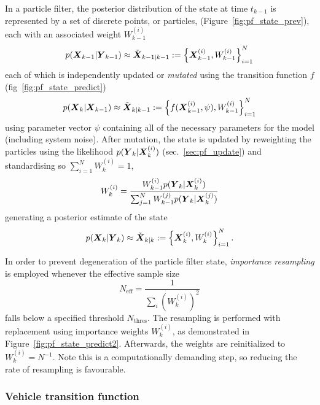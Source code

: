 In a particle filter, the posterior distribution of the state at time $t_{k-1}$
is represented by a set of discrete points, or particles, (Figure~\ref{fig:pf_state_prev}),
each with an associated weight $W_{k-1}^{(i)}$
\begin{equation}
p(\mbox{$\boldsymbol{X}$}_{k-1} | \mbox{$\boldsymbol{Y}$}_{k-1}) \approx \tilde{\mbox{$\boldsymbol{X}$}}_{k-1|k-1} 
:= \left\{\mbox{$\boldsymbol{X}$}_{k-1}^{(i)}, W_{k-1}^{(i)}\right\}_{i=1}^N
\end{equation}
each of which is independently updated or \emph{mutated} using the transition function $f$ (fig~\ref{fig:pf_state_predict})
\begin{equation}
p(\mbox{$\boldsymbol{X}$}_k | \mbox{$\boldsymbol{X}$}_{k-1}) \approx \tilde{\mbox{$\boldsymbol{X}$}}_{k|k-1} := 
\left\{f(\mbox{$\boldsymbol{X}$}_{k-1}^{(i)}, \psi), W_{k-1}^{(i)}\right\}_{i=1}^N
\end{equation}
using parameter vector $\psi$ containing all of the necessary parameters
for the model (including system noise).
After mutation, 
the state is updated by reweighting the particles using the likelihood $p(\mbox{$\boldsymbol{Y}$}_k | \mbox{$\boldsymbol{X}$}_k^{(i)})$ 
(sec.~\ref{sec:pf_update}) and standardising so $\sum_{i=1}^N W_k^{(i)} = 1$,
\begin{equation*}
W_k^{(i)} = \frac{W_{k-1}^{(i)} p(\mbox{$\boldsymbol{Y}$}_k | \mbox{$\boldsymbol{X}$}_k^{(i)})}{
    \sum_{j=1}^N W_{k-1}^{(j)} p(\mbox{$\boldsymbol{Y}$}_k | \mbox{$\boldsymbol{X}$}_k^{(j)})
}
\end{equation*}
generating a posterior estimate of the state
\begin{equation}
p(\mbox{$\boldsymbol{X}$}_k | \mbox{$\boldsymbol{Y}$}_k) \approx \tilde{\mbox{$\boldsymbol{X}$}}_{k|k} := 
\left\{\mbox{$\boldsymbol{X}$}_{k}^{(i)}, W_{k}^{(i)}\right\}_{i=1}^N.
\end{equation}

In order to prevent degeneration of the particle filter state,
\emph{importance resampling} is employed whenever the 
effective sample size 
\begin{equation}
\label{eq:neff}
N_{\text{eff}} = \frac{1}{\sum_i (W_k^{(i)})^2}
\end{equation}
falls below a specified threshold $N_{\text{thres}}$.
The resampling is performed with replacement using importance weights $W_k^{(i)}$,
as demonstrated in Figure~\ref{fig:pf_state_predict2}.
Afterwards, the weights are reinitialized to $W_k^{(i)} = N^{-1}$.
Note this is a computationally demanding step,
so reducing the rate of resampling is favourable.



\subsubsection{Vehicle transition function}
\label{sec:pf_prediction}

